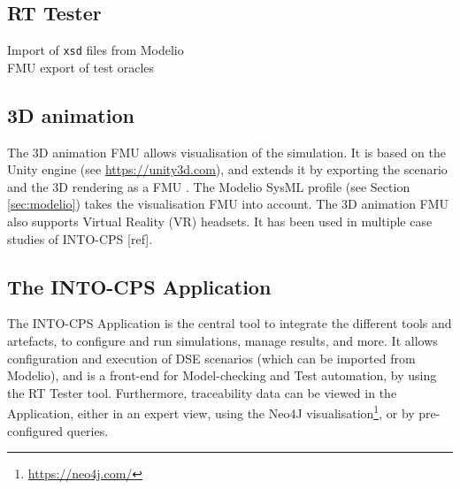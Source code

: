 \subsection{RT Tester}

Import of \texttt{xsd} files from Modelio\\
FMU export of test oracles \\

\subsection{3D animation}

The 3D animation FMU allows visualisation of the simulation. It is based on the Unity engine (see \url{https://unity3d.com}), and extends it by exporting the scenario and the 3D rendering as a FMU \cite{Foldager&17}. The Modelio SysML profile (see Section \ref{sec:modelio}) takes the visualisation FMU into account. The 3D animation FMU also supports Virtual Reality (VR) headsets. It has been used in multiple case studies of INTO-CPS [ref].

\subsection{The INTO-CPS Application}

The INTO-CPS Application is the central tool to integrate the different tools and artefacts, to configure and run simulations, manage results, and more. It allows configuration and execution of DSE scenarios (which can be imported from Modelio), and is a front-end for Model-checking and Test automation, by using the RT Tester tool. Furthermore, traceability data can be viewed in the Application, either in an expert view, using the Neo4J visualisation\footnote{\url{https://neo4j.com/}}, or by pre-configured queries.

